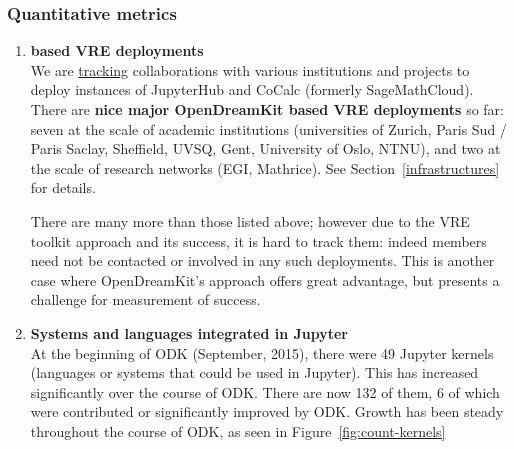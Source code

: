 \subsubsection{Quantitative metrics}
\begin{enumerate}
\item \textbf{\ODK based VRE deployments}\\
  We are
  \href{https://github.com/OpenDreamKit/OpenDreamKit/issues/174}{tracking}
  collaborations with various institutions and projects to deploy
  instances of JupyterHub and CoCalc (formerly SageMathCloud). There
  are \textbf{nice major OpenDreamKit based VRE deployments} so far:
  seven at the scale of academic institutions (universities of Zurich,
  Paris Sud / Paris Saclay, Sheffield, UVSQ, Gent, University of Oslo, NTNU), and two at the
  scale of research networks (EGI, Mathrice). See
  Section~\ref{infrastructures} for details.

  There are many more than those listed above; however due to the VRE
  toolkit approach and its success, it is hard to track them: indeed
  \ODK members need not be contacted or involved in any such
  deployments. This is another case where OpenDreamKit's approach
  offers great advantage, but presents a challenge for measurement of
  success.


\item \textbf{Systems and languages integrated in Jupyter}\\
  At the beginning of ODK (September, 2015), there were 49 Jupyter kernels (languages or
  systems that could be used in Jupyter).
  This has increased significantly over the course of ODK. There are now 132 of them, 6
  of which were contributed or significantly improved by ODK.
  Growth has been steady throughout the course of ODK,
  as seen in Figure~\ref{fig:count-kernels}


\end{enumerate}
